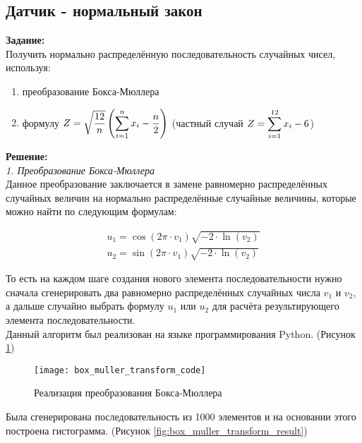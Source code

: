 \subsection*{Датчик - нормальный закон}

\textbf{Задание:}\\
Получить нормально распределённую последовательность случайных чисел, используя:
\begin{enumerate}[topsep=0pt,itemsep=-1ex,partopsep=1ex,parsep=1ex]
	\item преобразование Бокса-Мюллера
	\item формулу $Z = \sqrt{\dfrac{12}{n}}\left(\smashoperator[r]{\sum_{i=1}^{n}} x_i - \dfrac{n}{2}\right)$ (частный случай $Z = \smashoperator[r]{\sum_{i=1}^{12}} x_i - 6$)
\end{enumerate}

\textbf{Решение:}\\
\textit{1. Преобразование Бокса-Мюллера}\\

Данное преобразование заключается в замене равномерно распределённых случайных величин на нормально распределённые случайные величины, которые можно найти по следующим формулам:
\begin{ceqn}
	\begin{align*}
		u_1 = \cos(2 \pi \cdot v_1) \sqrt{-2 \cdot \ln(v_2)}\\
		u_2 = \sin(2 \pi \cdot v_1) \sqrt{-2 \cdot \ln(v_2)}
	\end{align*}
\end{ceqn}
То есть на каждом шаге создания нового элемента последовательности нужно сначала сгенерировать два равномерно распределённых случайных числа $v_1$ и $v_2$, а дальше случайно выбрать формулу $u_1$ или $u_2$ для расчёта результирующего элемента последовательности.\\

\newpage
Данный алгоритм был реализован на языке программирования Python. (Рисунок \ref{fig:box_muller_transform_code})
\begin{figure}[h]
	\centering \texttt{[image: box\_muller\_transform\_code]}
	\caption{Реализация преобразования Бокса-Мюллера}
	\label{fig:box_muller_transform_code}
\end{figure}

Была сгенерирована последовательность из 1000 элементов и на основании этого построена гистограмма. (Рисунок \ref{fig:box_muller_transform_result})

